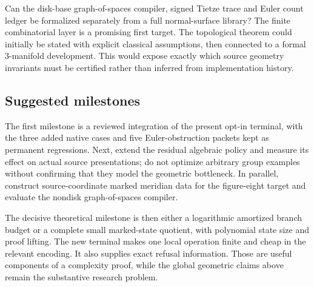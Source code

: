 \begin{question}
Can the disk-base graph-of-spaces compiler, signed Tietze trace and Euler count
ledger be formalized separately from a full normal-surface library? The finite
combinatorial layer is a promising first target. The topological theorem could
initially be stated with explicit classical assumptions, then connected to a
formal 3-manifold development. This would expose exactly which source geometry
invariants must be certified rather than inferred from implementation history.
\end{question}

\subsection{Suggested milestones}

The first milestone is a reviewed integration of the present opt-in terminal,
with the three added native cases and five Euler-obstruction packets kept as
permanent regressions. Next, extend the residual algebraic policy and measure
its effect on actual source presentations; do not optimize arbitrary group
examples without confirming that they model the geometric bottleneck. In
parallel, construct source-coordinate marked meridian data for the figure-eight
target and evaluate the nondisk graph-of-spaces compiler.

The decisive theoretical milestone is then either a logarithmic amortized
branch budget or a complete small marked-state quotient, with polynomial state
size and proof lifting. The new terminal makes one local operation finite and
cheap in the relevant encoding. It also supplies exact refusal information.
Those are useful components of a complexity proof, while the global geometric
claims above remain the substantive research problem.
